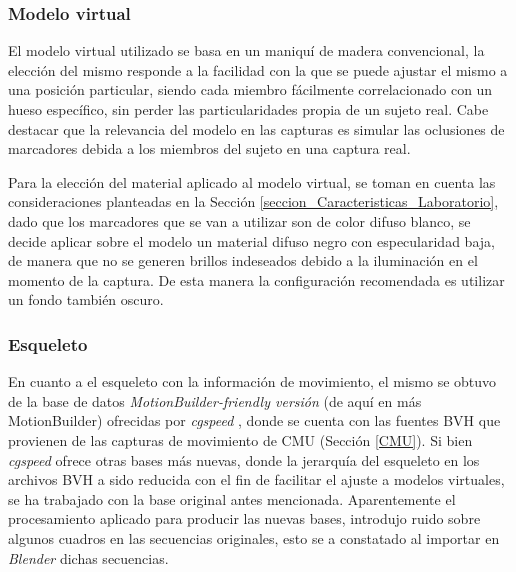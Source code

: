 \subsubsection*{Modelo virtual}  
El modelo virtual utilizado se basa en un maniquí de madera convencional, la elección del mismo responde a la facilidad con la que se puede ajustar el mismo a una posición particular, siendo cada miembro fácilmente correlacionado con un hueso específico, sin perder las particularidades propia de un sujeto real. Cabe destacar que la relevancia del modelo en las capturas es simular las oclusiones de marcadores debida a los miembros del sujeto en una captura real.  

Para la elección del material aplicado al modelo virtual, se toman en cuenta las consideraciones planteadas en la Sección \ref{seccion_Caracteristicas_Laboratorio}, dado que los marcadores que se van a utilizar son de color difuso blanco, se decide aplicar sobre el modelo un material difuso negro con especularidad baja, de manera que no se generen brillos indeseados debido a la iluminación en el momento de la captura. De esta manera la configuración recomendada es utilizar un fondo también oscuro.

\subsubsection*{Esqueleto}
En cuanto a el esqueleto con la información de movimiento, el mismo se obtuvo de la base de datos \textit{MotionBuilder-friendly versión} (de aquí en más MotionBuilder) ofrecidas por \textit{cgspeed} \cite{cgspeed}, 
 donde se cuenta con las fuentes BVH que provienen de las capturas de movimiento de CMU (Sección \ref{CMU}). Si bien\textit{ cgspeed} ofrece otras bases más nuevas, donde la jerarquía del esqueleto en los archivos BVH a sido reducida con el fin de facilitar el ajuste a modelos virtuales, se ha trabajado con la base original antes mencionada. Aparentemente el procesamiento aplicado para producir las nuevas bases, introdujo ruido sobre algunos cuadros en las secuencias originales, esto se a constatado al importar en \textit{Blender} dichas secuencias.
      

